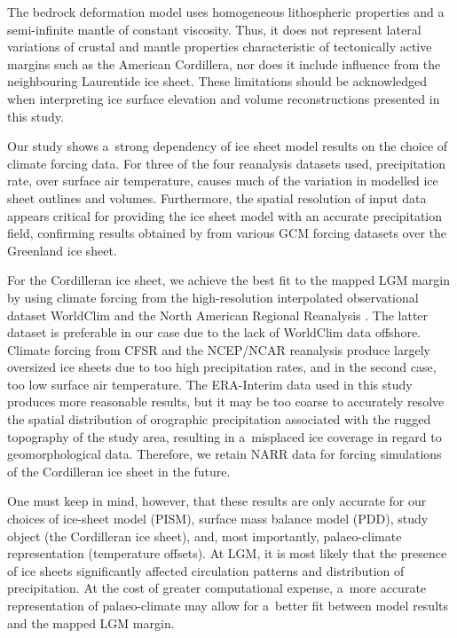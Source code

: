 \documentclass[tc, ms]{copernicus}
\begin{document}
The bedrock deformation model uses homogeneous lithospheric properties and a semi-infinite mantle of constant viscosity. Thus, it does not represent lateral variations of crustal and mantle properties characteristic of tectonically active margins such as the American Cordillera, nor does it include influence from the neighbouring Laurentide ice sheet. These limitations should be acknowledged when interpreting ice surface elevation and volume reconstructions presented in this study.

\conclusions
\label{sec:concl}

Our study shows a~strong dependency of ice sheet model results on the choice of climate forcing data. For three of the four reanalysis datasets used, precipitation rate, over surface air temperature, causes much of the variation in modelled ice sheet outlines and volumes. Furthermore, the spatial resolution of input data appears critical for providing the ice sheet model with an accurate precipitation field, confirming results obtained by \citet{quiquet-etal-2012} from various GCM forcing datasets over the Greenland ice sheet.

For the Cordilleran ice sheet, we achieve the best fit to the mapped LGM margin by \citet{dyke-2004} using climate forcing from the high-resolution interpolated observational dataset WorldClim \citep{data:worldclim} and the North American Regional Reanalysis \citep[NARR;][]{data:narr}. The latter dataset is preferable in our case due to the lack of WorldClim data offshore. Climate forcing from CFSR and the NCEP/NCAR reanalysis produce largely oversized ice sheets due to too high precipitation rates, and in the second case, too low surface air temperature. The ERA-Interim data used in this study produces more reasonable results, but it may be too coarse to accurately resolve the spatial distribution of orographic precipitation associated with the rugged topography of the study area, resulting in a~misplaced ice coverage in regard to geomorphological data. Therefore, we retain NARR data for forcing simulations of the Cordilleran ice sheet in the future.

One must keep in mind, however, that these results are only accurate for our choices of ice-sheet model (PISM), surface mass balance model (PDD), study object (the Cordilleran ice sheet), and, most importantly, palaeo-climate representation (temperature offsets). At LGM, it is most likely that the presence of ice sheets significantly affected circulation patterns and distribution of precipitation. At the cost of greater computational expense, a~more accurate representation of palaeo-climate may allow for a~better fit between model results and the mapped LGM margin.
\end{document}

